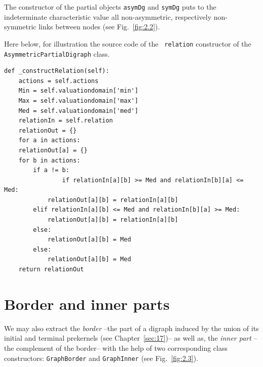 The constructor of the partial objects \texttt{asymDg} and \texttt{symDg} puts to the indeterminate characteristic value all non-asymmetric, respectively non-symmetric links between nodes (see Fig.~\vref{fig:2.2}).

Here below, for illustration the source code of the \texttt{ relation} constructor of the \texttt{AsymmetricPartialDigraph} class.
\begin{lstlisting}[caption={Computing the asymmetric part of a bipolar-valued relation},label=list:2.4,basicstyle=\ttfamily\scriptsize]
def _constructRelation(self):
    actions = self.actions
    Min = self.valuationdomain['min']
    Max = self.valuationdomain['max']
    Med = self.valuationdomain['med']
    relationIn = self.relation
    relationOut = {}
    for a in actions:
	relationOut[a] = {}
	for b in actions:
	    if a != b:
                if relationIn[a][b] >= Med and relationIn[b][a] <= Med:
		    relationOut[a][b] = relationIn[a][b]
		elif relationIn[a][b] <= Med and relationIn[b][a] >= Med:
		    relationOut[a][b] = relationIn[a][b]
		else:
		    relationOut[a][b] = Med
		else:
		    relationOut[a][b] = Med
    return relationOut
\end{lstlisting}

\section{Border and inner parts}
\label{sec:2.4}

We may also extract the \emph{border} --the part of a digraph induced by the union of its initial and terminal prekernels (see Chapter~\ref{sec:17})--  as well as, the \emph{inner part} --the complement of the border-- with the help of two corresponding class constructors: \texttt{GraphBorder} and \texttt{GraphInner} (see Fig.~\vref{fig:2.3}).

